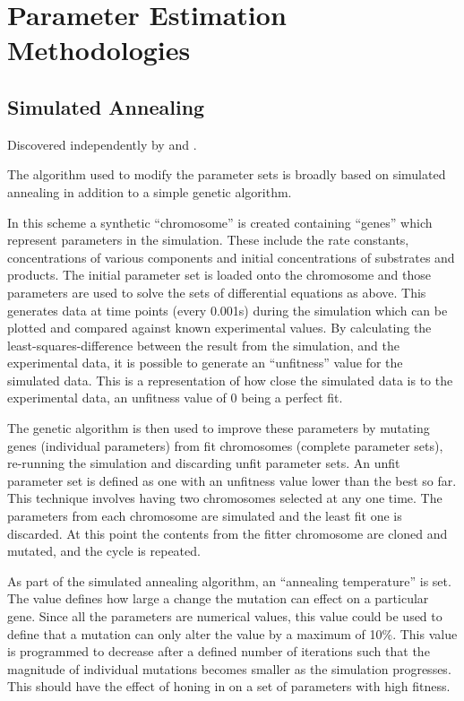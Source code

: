 \chapter{Parameter Estimation Methodologies}
\section{Simulated Annealing}

Discovered independently by \citet{Kirkpatrick1983} and \citet{Cerny1985}.
\citet{Bertsimas1993}

The algorithm used to modify the parameter sets is broadly based on simulated annealing in addition to a simple genetic algorithm.
 
In this scheme a synthetic ``chromosome'' is created containing ``genes'' which represent parameters in the simulation. These include the rate constants, concentrations of various components and initial concentrations of substrates and products. The initial parameter set is loaded onto the chromosome and those parameters are used to solve the sets of differential equations as above. This generates data at time points (every 0.001s) during the simulation which can be plotted and compared against known experimental values. By calculating the least-squares-difference between the result from the simulation, and the experimental data, it is possible to generate an ``unfitness'' value for the simulated data. This is a representation of how close the simulated data is to the experimental data, an unfitness value of 0 being a perfect fit. 

The genetic algorithm is then used to improve these parameters by mutating genes (individual parameters) from fit chromosomes (complete parameter sets), re-running the simulation and discarding unfit parameter sets. An unfit parameter set is defined as one with an unfitness value lower than the best so far. This technique involves having two chromosomes selected at any one time. The parameters from each chromosome are simulated and the least fit one is discarded. At this point the contents from the fitter chromosome are cloned and mutated, and the cycle is repeated.

As part of the simulated annealing algorithm, an ``annealing temperature'' is set. The value defines how large a change the mutation can effect on a particular gene. Since all the parameters are numerical values, this value could be used to define that a mutation can only alter the value by a maximum of 10\%. This value is programmed to decrease after a defined number of iterations such that the magnitude of individual mutations becomes smaller as the simulation progresses. This should have the effect of honing in on a set of parameters with high fitness.


